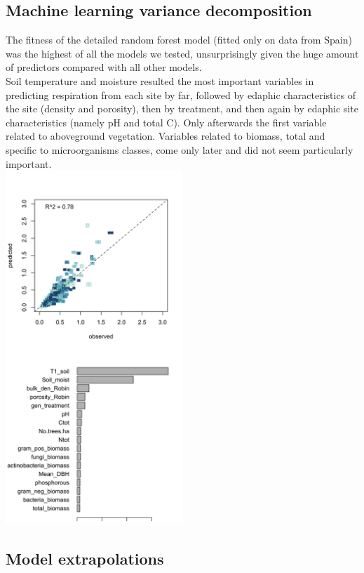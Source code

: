 \documentclass[
]{article}
\begin{document}
\subsection{Machine learning variance decomposition}\label{machine-learning-variance-decomposition-1}

The fitness of the detailed random forest model (fitted only on data from Spain) was the highest of all the models we tested, unsurprisingly given the huge amount of predictors compared with all other models.\\
Soil temperature and moisture resulted the most important variables in predicting respiration from each site by far, followed by edaphic characteristics of the site (density and porosity), then by treatment, and then again by edaphic site characteristics (namely pH and total C). Only afterwards the first variable related to aboveground vegetation. Variables related to biomass, total and specific to microorganisms classes, come only later and did not seem particularly important.\\
\includegraphics[width=0.5\textwidth,height=\textheight]{../Figures/variance_decomposition.png}

\subsection{Model extrapolations}\label{model-extrapolations}
\end{document}
